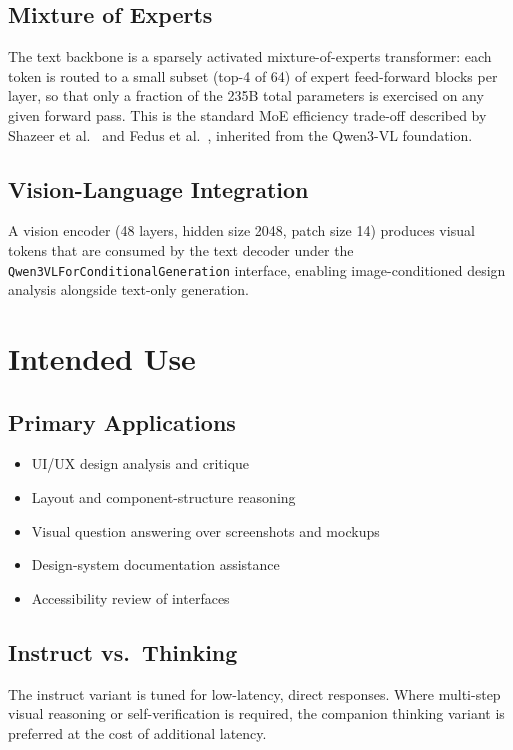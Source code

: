 \documentclass[11pt,a4paper]{article}
\begin{document}
\subsection{Mixture of Experts}
The text backbone is a sparsely activated mixture-of-experts transformer: each token is
routed to a small subset (top-4 of 64) of expert feed-forward blocks per layer, so that only
a fraction of the 235B total parameters is exercised on any given forward pass. This is the
standard MoE efficiency trade-off described by Shazeer et al.~\cite{shazeer2017outrageously}
and Fedus et al.~\cite{fedus2022switch}, inherited from the Qwen3-VL foundation.

\subsection{Vision-Language Integration}
A vision encoder (48 layers, hidden size 2048, patch size 14) produces visual tokens that are
consumed by the text decoder under the \texttt{Qwen3VLForConditionalGeneration} interface,
enabling image-conditioned design analysis alongside text-only generation.

\section{Intended Use}

\subsection{Primary Applications}
\begin{itemize}
    \item UI/UX design analysis and critique
    \item Layout and component-structure reasoning
    \item Visual question answering over screenshots and mockups
    \item Design-system documentation assistance
    \item Accessibility review of interfaces
\end{itemize}

\subsection{Instruct vs.\ Thinking}
The instruct variant is tuned for low-latency, direct responses. Where multi-step visual
reasoning or self-verification is required, the companion thinking variant is preferred at the
cost of additional latency.
\end{document}
